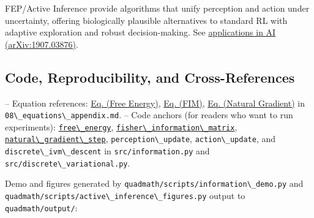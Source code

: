 \documentclass[
  10pt,
]{article}
\newcommand{\passthrough}[1]{#1}
\begin{document}
FEP/Active Inference provide algorithms that unify perception and action
under uncertainty, offering biologically plausible alternatives to
standard RL with adaptive exploration and robust decision-making. See
\href{https://arxiv.org/abs/1907.03876}{applications in AI
(arXiv:1907.03876)}.

\hypertarget{code-reproducibility-and-cross-references}{%
\subsection{Code, Reproducibility, and
Cross-References}\label{code-reproducibility-and-cross-references}}

-- Equation references:
\href{08_equations_appendix.md\#eq:free_energy}{Eq. (Free Energy)},
\href{08_equations_appendix.md\#eq:fim}{Eq. (FIM)},
\href{08_equations_appendix.md\#eq:natgrad}{Eq. (Natural Gradient)} in
\passthrough{\lstinline!08\_equations\_appendix.md!}. -- Code anchors
(for readers who want to run experiments):
\href{03_quadray_methods.md\#code:free_energy}{\passthrough{\lstinline!free\_energy!}},
\href{03_quadray_methods.md\#code:fisher_information_matrix}{\passthrough{\lstinline!fisher\_information\_matrix!}},
\href{03_quadray_methods.md\#code:natural_gradient_step}{\passthrough{\lstinline!natural\_gradient\_step!}},
\passthrough{\lstinline!perception\_update!},
\passthrough{\lstinline!action\_update!}, and
\passthrough{\lstinline!discrete\_ivm\_descent!} in
\passthrough{\lstinline!src/information.py!} and
\passthrough{\lstinline!src/discrete\_variational.py!}.

Demo and figures generated by
\passthrough{\lstinline!quadmath/scripts/information\_demo.py!} and
\passthrough{\lstinline!quadmath/scripts/active\_inference\_figures.py!}
output to \passthrough{\lstinline!quadmath/output/!}:
\end{document}
